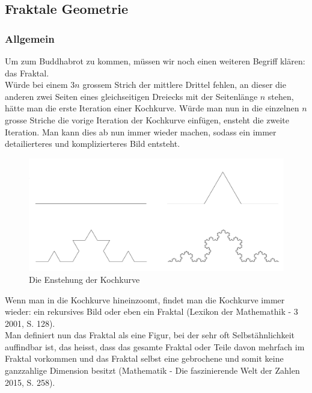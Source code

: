 \subsection{Fraktale Geometrie}
\subsubsection{Allgemein}
Um zum Buddhabrot zu kommen, müssen wir noch einen weiteren Begriff klären: das Fraktal.\\ Würde bei einem 3$n$ grossem Strich der mittlere Drittel fehlen, an dieser die anderen zwei Seiten eines gleichseitigen Dreiecks mit der Seitenlänge $n$ stehen, hätte man die erste Iteration einer Kochkurve. Würde man nun in die einzelnen $n$ grosse Striche die vorige Iteration der Kochkurve einfügen, ensteht die zweite Iteration. Man kann dies ab nun immer wieder machen, sodass ein immer detailierteres und komplizierteres Bild entsteht.\\

\begin{figure}[h]
    \centering
    \includegraphics[width=.5\textwidth]{Pictures/Kochkurve.png}
    \caption{Die Enstehung der Kochkurve}
    \label{fig:Kochkurve}
\end{figure}
Wenn man in die Kochkurve hineinzoomt, findet man die Kochkurve immer wieder: ein rekursives Bild oder eben ein Fraktal (Lexikon der Mathemathik - 3 2001, S. 128).\\Man definiert nun das Fraktal als eine Figur, bei der sehr oft Selbstähnlichkeit auffindbar ist, das heisst, dass das gesamte Fraktal oder Teile davon mehrfach im Fraktal vorkommen und das Fraktal selbst eine gebrochene und somit keine ganzzahlige Dimension besitzt (Mathematik - Die faszinierende Welt der Zahlen 2015, S. 258).\\

